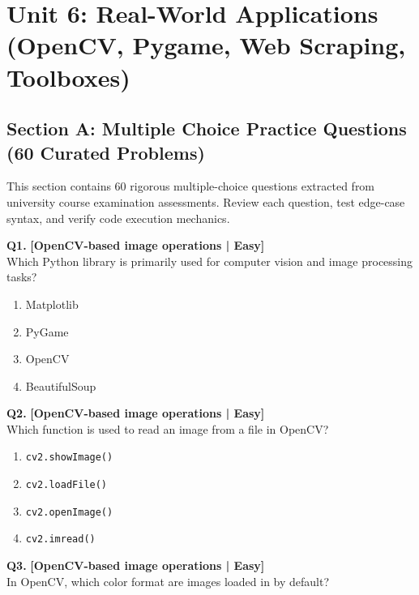\chapter{Unit 6: Real-World Applications (OpenCV, Pygame, Web Scraping, Toolboxes)}

\section{Section A: Multiple Choice Practice Questions (60 Curated Problems)}

\noindent This section contains 60 rigorous multiple-choice questions extracted from university course examination assessments. Review each question, test edge-case syntax, and verify code execution mechanics.
\vspace{3mm}

\noindent\textbf{Q1.} \hfill {\small\color{LPUOrange}\textbf{[OpenCV-based image operations | Easy]}}\\[2pt]
Which Python library is primarily used for computer vision and image processing tasks?

\begin{enumerate}[label=(\alph*),topsep=2pt,itemsep=1pt,partopsep=0pt,parsep=0pt]
    \item \relax Matplotlib
    \item \relax PyGame
    \item \relax OpenCV
    \item \relax BeautifulSoup
\end{enumerate}
\vspace{2mm}

\noindent\textbf{Q2.} \hfill {\small\color{LPUOrange}\textbf{[OpenCV-based image operations | Easy]}}\\[2pt]
Which function is used to read an image from a file in OpenCV?

\begin{enumerate}[label=(\alph*),topsep=2pt,itemsep=1pt,partopsep=0pt,parsep=0pt]
    \item \relax \texttt{cv2.showImage()}
    \item \relax \texttt{cv2.loadFile()}
    \item \relax \texttt{cv2.openImage()}
    \item \relax \texttt{cv2.imread()}
\end{enumerate}
\vspace{2mm}

\noindent\textbf{Q3.} \hfill {\small\color{LPUOrange}\textbf{[OpenCV-based image operations | Easy]}}\\[2pt]
In OpenCV, which color format are images loaded in by default?

